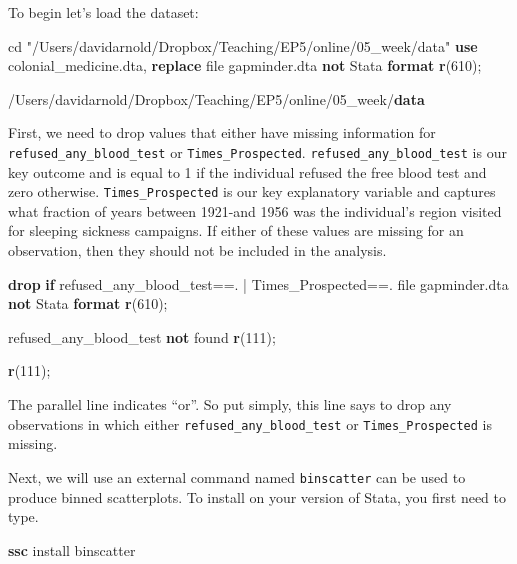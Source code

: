 \documentclass[
]{book}
\newenvironment{Shaded}{\begin{snugshade}}{\end{snugshade}}
\newcommand{\FunctionTok}[1]{\textcolor[rgb]{0.13,0.29,0.53}{\textbf{#1}}}
\newcommand{\KeywordTok}[1]{\textcolor[rgb]{0.13,0.29,0.53}{\textbf{#1}}}
\newcommand{\NormalTok}[1]{#1}
\newcommand{\StringTok}[1]{\textcolor[rgb]{0.31,0.60,0.02}{#1}}
\begin{document}
To begin let's load the dataset:

\begin{Shaded}
\begin{Highlighting}[]
\NormalTok{cd }\StringTok{"/Users/davidarnold/Dropbox/Teaching/EP5/online/05\_week/data"}
\KeywordTok{use}\NormalTok{ colonial\_medicine.dta, }\KeywordTok{replace}
\NormalTok{file gapminder.dta }\KeywordTok{not}\NormalTok{ Stata }\KeywordTok{format}
\FunctionTok{r}\NormalTok{(610);}


\NormalTok{/Users/davidarnold/Dropbox/Teaching/EP5/online/05\_week/}\KeywordTok{data}
\end{Highlighting}
\end{Shaded}

First, we need to drop values that either have missing information for \texttt{refused\_any\_blood\_test} or \texttt{Times\_Prospected}. \texttt{refused\_any\_blood\_test} is our key outcome and is equal to 1 if the individual refused the free blood test and zero otherwise. \texttt{Times\_Prospected} is our key explanatory variable and captures what fraction of years between 1921-and 1956 was the individual's region visited for sleeping sickness campaigns. If either of these values are missing for an observation, then they should not be included in the analysis.

\begin{Shaded}
\begin{Highlighting}[]
\KeywordTok{drop} \KeywordTok{if}\NormalTok{ refused\_any\_blood\_test==. | Times\_Prospected==. }
\NormalTok{file gapminder.dta }\KeywordTok{not}\NormalTok{ Stata }\KeywordTok{format}
\FunctionTok{r}\NormalTok{(610);}


\NormalTok{refused\_any\_blood\_test }\KeywordTok{not}\NormalTok{ found}
\FunctionTok{r}\NormalTok{(111);}

\FunctionTok{r}\NormalTok{(111);}
\end{Highlighting}
\end{Shaded}

The parallel line \texttt{\textbar{}} indicates ``or''. So put simply, this line says to drop any observations in which either \texttt{refused\_any\_blood\_test} or \texttt{Times\_Prospected} is missing.

Next, we will use an external command named \texttt{binscatter} can be used to produce binned scatterplots. To install on your version of Stata, you first need to type.

\begin{Shaded}
\begin{Highlighting}[]
\KeywordTok{ssc}\NormalTok{ install binscatter}
\end{Highlighting}
\end{Shaded}
\end{document}

